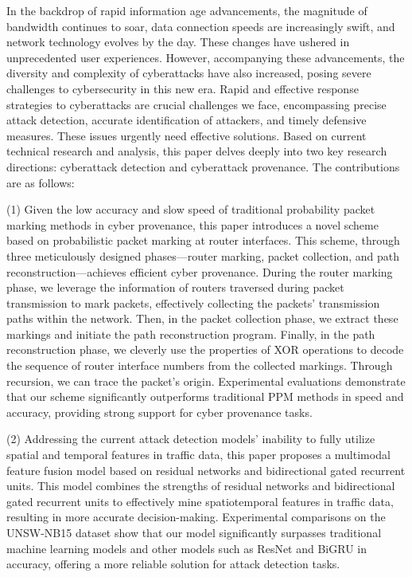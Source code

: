 
\begin{eabstract} 

In the backdrop of rapid information age advancements, the magnitude of bandwidth continues to soar, data connection speeds are increasingly swift, and network technology evolves by the day.
These changes have ushered in unprecedented user experiences. However, accompanying these advancements, the diversity and complexity of cyberattacks have also increased, posing severe challenges to cybersecurity in this new era. Rapid and effective response strategies to cyberattacks are crucial challenges we face, encompassing precise attack detection, accurate identification of attackers, and timely defensive measures. 
These issues urgently need effective solutions. 
Based on current technical research and analysis, this paper delves deeply into two key research directions: cyberattack detection and cyberattack provenance. 
The contributions are as follows:


  (1) Given the low accuracy and slow speed of traditional probability packet marking methods in cyber provenance, this paper introduces a novel scheme based on probabilistic packet marking at router interfaces. 
  This scheme, through three meticulously designed phases—router marking, packet collection, and path reconstruction—achieves efficient cyber provenance.
  During the router marking phase, we leverage the information of routers traversed during packet transmission to mark packets, effectively collecting the packets’ transmission paths within the network. 
  Then, in the packet collection phase, we extract these markings and initiate the path reconstruction program. Finally, in the path reconstruction phase, we cleverly use the properties of XOR operations to decode the sequence of router interface numbers from the collected markings. 
  Through recursion, we can trace the packet’s origin. Experimental evaluations demonstrate that our scheme significantly outperforms traditional PPM methods in speed and accuracy, providing strong support for cyber provenance tasks.\par
  
  
  (2) Addressing the current attack detection models’ inability to fully utilize spatial and temporal features in traffic data, this paper proposes a multimodal feature fusion model based on residual networks and bidirectional gated recurrent units. 
  This model combines the strengths of residual networks and bidirectional gated recurrent units to effectively mine spatiotemporal features in traffic data, resulting in more accurate decision-making. 
  Experimental comparisons on the UNSW-NB15 dataset show that our model significantly surpasses traditional machine learning models and other models such as ResNet and BiGRU in accuracy, offering a more reliable solution for attack detection tasks.\par
  

\end{eabstract}
